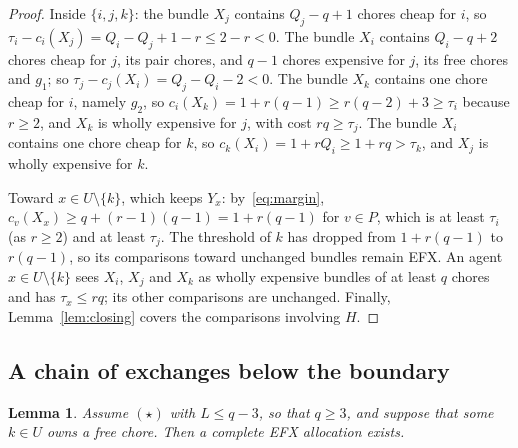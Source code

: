 \documentclass{amsart}
\numberwithin{equation}{section}
\newtheorem{lemma}[theorem]{Lemma}
\theoremstyle{definition}
\theoremstyle{remark}
\begin{document}
\begin{proof}
Inside $\{i,j,k\}$: the bundle $X_j$ contains $Q_j-q+1$ chores cheap for $i$, so $\tau_i-c_i(X_j)=Q_i-Q_j+1-r\le 2-r<0$. The bundle $X_i$ contains $Q_i-q+2$ chores cheap for $j$, its pair chores, and $q-1$ chores expensive for $j$, its free chores and $g_1$; so $\tau_j-c_j(X_i)=Q_j-Q_i-2<0$. The bundle $X_k$ contains one chore cheap for $i$, namely $g_2$, so $c_i(X_k)=1+r(q-1)\ge r(q-2)+3\ge\tau_i$ because $r\ge2$, and $X_k$ is wholly expensive for $j$, with cost $rq\ge\tau_j$. The bundle $X_i$ contains one chore cheap for $k$, so $c_k(X_i)=1+rQ_i\ge1+rq>\tau_k$, and $X_j$ is wholly expensive for $k$.

Toward $x\in U\setminus\{k\}$, which keeps $Y_x$: by~\eqref{eq:margin}, $c_v(X_x)\ge q+(r-1)(q-1)=1+r(q-1)$ for $v\in P$, which is at least $\tau_i$ (as $r\ge2$) and at least $\tau_j$. The threshold of $k$ has dropped from $1+r(q-1)$ to $r(q-1)$, so its comparisons toward unchanged bundles remain EFX. An agent $x\in U\setminus\{k\}$ sees $X_i$, $X_j$ and $X_k$ as wholly expensive bundles of at least $q$ chores and has $\tau_x\le rq$; its other comparisons are unchanged. Finally, Lemma~\ref{lem:closing} covers the comparisons involving $H$.
\end{proof}

\subsection{A chain of exchanges below the boundary}

\begin{lemma}\label{lem:chain}
Assume $(\star)$ with $L\le q-3$, so that $q\ge3$, and suppose that some $k\in U$ owns a free chore. Then a complete EFX allocation exists.
\end{lemma}
\end{document}

